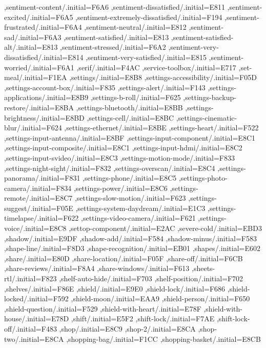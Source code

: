 { ,sentiment-content/.initial=F6A6
 ,sentiment-dissatisfied/.initial=E811
 ,sentiment-excited/.initial=F6A5
 ,sentiment-extremely-dissatisfied/.initial=F194
 ,sentiment-frustrated/.initial=F6A4
 ,sentiment-neutral/.initial=E812
 ,sentiment-sad/.initial=F6A3
 ,sentiment-satisfied/.initial=E813
 ,sentiment-satisfied-alt/.initial=E813
 ,sentiment-stressed/.initial=F6A2
 ,sentiment-very-dissatisfied/.initial=E814
 ,sentiment-very-satisfied/.initial=E815
 ,sentiment-worried/.initial=F6A1
 ,serif/.initial=F4AC
 ,service-toolbox/.initial=E717
 ,set-meal/.initial=F1EA
 ,settings/.initial=E8B8
 ,settings-accessibility/.initial=F05D
 ,settings-account-box/.initial=F835
 ,settings-alert/.initial=F143
 ,settings-applications/.initial=E8B9
 ,settings-b-roll/.initial=F625
 ,settings-backup-restore/.initial=E8BA
 ,settings-bluetooth/.initial=E8BB
 ,settings-brightness/.initial=E8BD
 ,settings-cell/.initial=E8BC
 ,settings-cinematic-blur/.initial=F624
 ,settings-ethernet/.initial=E8BE
 ,settings-heart/.initial=F522
 ,settings-input-antenna/.initial=E8BF
 ,settings-input-component/.initial=E8C1
 ,settings-input-composite/.initial=E8C1
 ,settings-input-hdmi/.initial=E8C2
 ,settings-input-svideo/.initial=E8C3
 ,settings-motion-mode/.initial=F833
 ,settings-night-sight/.initial=F832
 ,settings-overscan/.initial=E8C4
 ,settings-panorama/.initial=F831
 ,settings-phone/.initial=E8C5
 ,settings-photo-camera/.initial=F834
 ,settings-power/.initial=E8C6
 ,settings-remote/.initial=E8C7
 ,settings-slow-motion/.initial=F623
 ,settings-suggest/.initial=F05E
 ,settings-system-daydream/.initial=E1C3
 ,settings-timelapse/.initial=F622
 ,settings-video-camera/.initial=F621
 ,settings-voice/.initial=E8C8
 ,settop-component/.initial=E2AC
 ,severe-cold/.initial=EBD3
 ,shadow/.initial=E9DF
 ,shadow-add/.initial=F584
 ,shadow-minus/.initial=F583
 ,shape-line/.initial=F8D3
 ,shape-recognition/.initial=EB01
 ,shapes/.initial=E602
 ,share/.initial=E80D
 ,share-location/.initial=F05F
 ,share-off/.initial=F6CB
 ,share-reviews/.initial=F8A4
 ,share-windows/.initial=F613
 ,sheets-rtl/.initial=F823
 ,shelf-auto-hide/.initial=F703
 ,shelf-position/.initial=F702
 ,shelves/.initial=F86E
 ,shield/.initial=E9E0
 ,shield-lock/.initial=F686
 ,shield-locked/.initial=F592
 ,shield-moon/.initial=EAA9
 ,shield-person/.initial=F650
 ,shield-question/.initial=F529
 ,shield-with-heart/.initial=E78F
 ,shield-with-house/.initial=E78D
 ,shift/.initial=E5F2
 ,shift-lock/.initial=F7AE
 ,shift-lock-off/.initial=F483
 ,shop/.initial=E8C9
 ,shop-2/.initial=E8CA
 ,shop-two/.initial=E8CA
 ,shopping-bag/.initial=F1CC
 ,shopping-basket/.initial=E8CB
}
